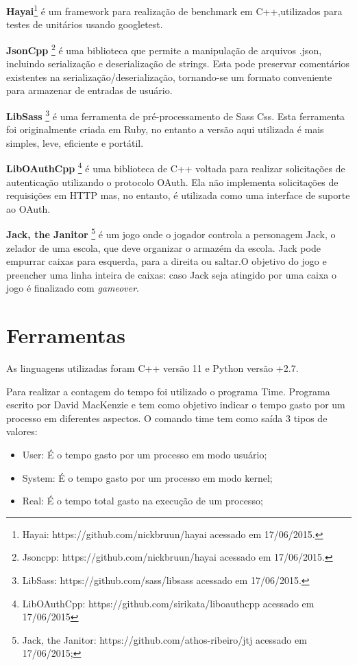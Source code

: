 \textbf{Hayai}\footnote{Hayai: https://github.com/nickbruun/hayai acessado em
 17/06/2015.} é um framework para realização de benchmark em C++,utilizados
 para testes de unitários usando googletest.

\textbf{JsonCpp} \footnote{Jsoncpp: https://github.com/nickbruun/hayai acessado
 em 17/06/2015. } é uma biblioteca que permite a manipulação de arquivos .json,
 incluindo serialização e deserialização de strings. Esta pode preservar
 comentários existentes na serialização/deserialização, tornando-se um formato
 conveniente para armazenar de entradas de usuário.

\textbf{LibSass} \footnote{LibSass: https://github.com/sass/libsass acessado
 em 17/06/2015.} é uma ferramenta de pré-processamento de Sass Css. Esta
 ferramenta foi originalmente criada em Ruby, no entanto a versão aqui utilizada
 é mais simples, leve, eficiente e portátil.

\textbf{LibOAuthCpp} \footnote{LibOAuthCpp: https://github.com/sirikata/liboauthcpp
 acessado em 17/06/2015} é uma biblioteca de C++ voltada para realizar solicitações
 de autenticação utilizando o protocolo OAuth. Ela não implementa solicitações de
 requisições em HTTP mas, no entanto, é utilizada como uma interface de suporte ao
 OAuth.

\textbf{Jack, the Janitor} \footnote{Jack, the Janitor: https://github.com/athos-ribeiro/jtj
 acessado em 17/06/2015;} é um jogo onde o jogador controla  a personagem Jack,
 o zelador de uma escola, que deve organizar o armazém da escola. Jack pode empurrar
 caixas para esquerda, para a direita ou saltar.O objetivo do jogo e preencher uma
 linha inteira de caixas: caso Jack seja atingido por uma caixa o jogo é finalizado
 com \textit{gameover}.

\section{Ferramentas}

As linguagens utilizadas foram C++ versão 11 e Python versão +2.7.

Para realizar a contagem do tempo foi utilizado o programa Time.
 Programa escrito por David MacKenzie e tem como objetivo indicar o tempo gasto
 por um processo em diferentes aspectos.
 O comando time tem como saída 3 tipos de valores:

\begin{itemize}
	\item User: É o tempo gasto por um processo em modo usuário;
	\item System:  É o tempo gasto por um processo em modo kernel;
	\item Real:  É o tempo total gasto na execução de um processo;
\end{itemize}

